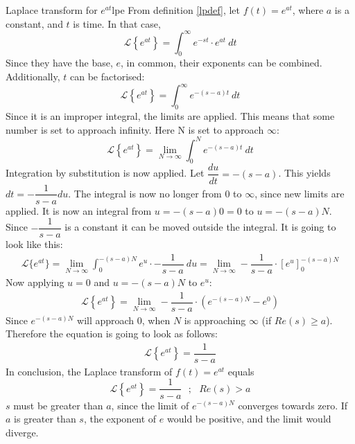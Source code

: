 \begin{example}{Laplace transform for $e^{at}$}{lpe}
From definition \ref{lpdef}, let $f(t)=e^{at}$, where $a$ is a constant, and $t$ is time. In that case,
$$\mathcal{L} \left\{e^{at} \right\}=\int_{0}^{\infty} e^{-st}\cdot e^{at}\ dt$$
Since they have the base, $e$, in common, their exponents can be combined. Additionally, $t$ can be factorised:
$$\mathcal{L} \left\{e^{at} \right\}=\int_{0}^{\infty} e^{-(s-a)t}\ dt$$
Since it is an improper integral, the limits are applied. This means that some number is set to approach infinity. Here N is set to approach $\infty$:
$$\mathcal{L} \left\{e^{at} \right\}=\lim_{N \to \infty} \int_{0}^{N} e^{-(s-a)t}\ dt$$
Integration by substitution is now applied. Let $\dfrac{du}{dt}=-(s-a)$. This yields $dt=-\dfrac{1}{s-a}du$. The integral is now no longer from 0 to $\infty$, since new limits are applied. It is now an integral from $u=-(s-a)0=0$ to $u=-(s-a)N$. Since $-\dfrac{1}{s-a}$ is a constant it can be moved outside the integral. It is going to look like this:
\begin{align}
\mathcal{L}\{e^{at}\}=\lim_{N \to \infty} \int_{0}^{-(s-a)N} e^{u}\cdot -\dfrac{1}{s-a}\ du = \lim_{N \to \infty} -\dfrac{1}{s-a} \cdot \left[e^{u} \right]_{0}^{-(s-a)N}
\label{eq6.2}
\end{align}
Now applying $u=0$ and $u=-(s-a)N$ to $e^{u}$:
\begin{align*}
\mathcal{L} \left\{e^{at} \right\} =\lim_{N \to \infty} -\dfrac{1}{s-a}\cdot (e^{-(s-a)N}-e^{0})
\end{align*}
Since $e^{-(s-a)N}$ will approach $0$, when $N$ is approaching $\infty$ (if $Re(s) \geq a$). Therefore the equation is going to look as follows:
\begin{align}
\mathcal{L} \left\{e^{at} \right\} = \dfrac{1}{s-a}
\end{align}
In conclusion, the Laplace transform of $f(t)=e^{at}$ equals
$$\mathcal{L} \left\{e^{at} \right\} =\dfrac{1}{s-a} \ \ \ ;\ \ \ Re(s)>a$$
$s$ must be greater than $a$, since the limit of $e^{-(s-a)N}$ converges towards zero. If $a$ is greater than $s$, the exponent of $e$ would be positive, and the limit would diverge.
\end{example}
